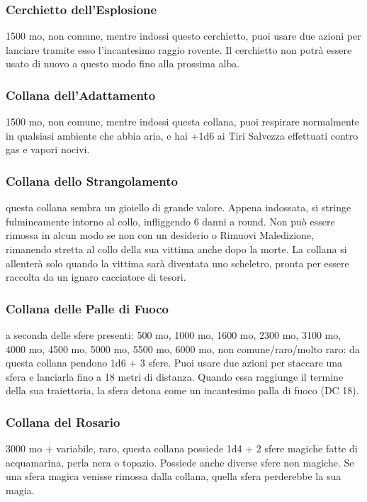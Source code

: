 \begin{multicols}{2}
\subsubsection*{Cerchietto dell'Esplosione}
1500 mo, non comune, mentre indossi questo cerchietto, puoi usare due azioni per lanciare tramite esso l'incantesimo raggio rovente. Il cerchietto non potrà essere usato di nuovo a questo modo fino alla prossima alba.


\subsubsection*{Collana dell'Adattamento}
1500 mo, non comune, mentre indossi questa collana, puoi respirare normalmente in qualsiasi ambiente che abbia aria, e hai +1d6 ai Tiri Salvezza effettuati contro gas e vapori nocivi.

\subsubsection*{Collana dello Strangolamento}
questa collana sembra un gioiello di grande valore. Appena indossata, si stringe fulmineamente intorno al collo, infliggendo 6 danni a round. Non può essere rimossa in alcun modo se non con un desiderio o Rimuovi Maledizione, rimanendo stretta al collo della sua vittima anche dopo la morte. La collana si allenterà solo quando la vittima sarà diventata uno scheletro, pronta per essere raccolta da un ignaro cacciatore di tesori.

\subsubsection*{Collana delle Palle di Fuoco}
a seconda delle sfere presenti: 500 mo, 1000 mo, 1600 mo, 2300 mo, 3100 mo, 4000 mo, 4500 mo, 5000 mo, 5500 mo, 6000 mo, non comune/raro/molto raro: da questa collana pendono 1d6 + 3 sfere. Puoi usare due azioni per staccare una sfera e lanciarla fino a 18 metri di distanza. Quando essa raggiunge il termine della sua traiettoria, la sfera detona come un incantesimo palla di fuoco (DC 18).

\subsubsection*{Collana del Rosario}
3000 mo + variabile, raro, questa collana possiede 1d4 + 2 sfere magiche fatte di acquamarina, perla nera o topazio. Possiede anche diverse sfere non magiche. Se una sfera magica venisse rimossa dalla collana, quella sfera perderebbe la sua magia.


\end{multicols}

